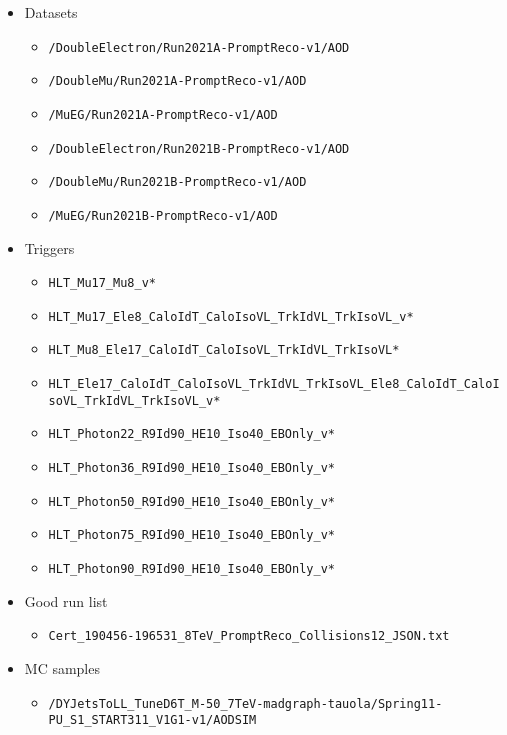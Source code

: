 \begin{itemize}
\item Datasets
  \begin{itemize}
  \item \verb=/DoubleElectron/Run2021A-PromptReco-v1/AOD=
  \item \verb=/DoubleMu/Run2021A-PromptReco-v1/AOD=
  \item \verb=/MuEG/Run2021A-PromptReco-v1/AOD=
  \item \verb=/DoubleElectron/Run2021B-PromptReco-v1/AOD=
  \item \verb=/DoubleMu/Run2021B-PromptReco-v1/AOD=
  \item \verb=/MuEG/Run2021B-PromptReco-v1/AOD=
  \end{itemize}

\item Triggers
  \begin{itemize}
    \item \verb=HLT_Mu17_Mu8_v*=
    \item \verb=HLT_Mu17_Ele8_CaloIdT_CaloIsoVL_TrkIdVL_TrkIsoVL_v*=
    \item \verb=HLT_Mu8_Ele17_CaloIdT_CaloIsoVL_TrkIdVL_TrkIsoVL*=
    \item {\footnotesize \verb=HLT_Ele17_CaloIdT_CaloIsoVL_TrkIdVL_TrkIsoVL_Ele8_CaloIdT_CaloIsoVL_TrkIdVL_TrkIsoVL_v*=}
    \item \verb=HLT_Photon22_R9Id90_HE10_Iso40_EBOnly_v*=
    \item \verb=HLT_Photon36_R9Id90_HE10_Iso40_EBOnly_v*=
    \item \verb=HLT_Photon50_R9Id90_HE10_Iso40_EBOnly_v*=
    \item \verb=HLT_Photon75_R9Id90_HE10_Iso40_EBOnly_v*=
    \item \verb=HLT_Photon90_R9Id90_HE10_Iso40_EBOnly_v*=
  \end{itemize}

\item Good run list
  \begin{itemize}
    \item \verb=Cert_190456-196531_8TeV_PromptReco_Collisions12_JSON.txt=
  \end{itemize}
  
\item MC samples
  \begin{itemize} 
  \item {\footnotesize \verb=/DYJetsToLL_TuneD6T_M-50_7TeV-madgraph-tauola/Spring11-PU_S1_START311_V1G1-v1/AODSIM=}
 \end{itemize}
\end{itemize}

